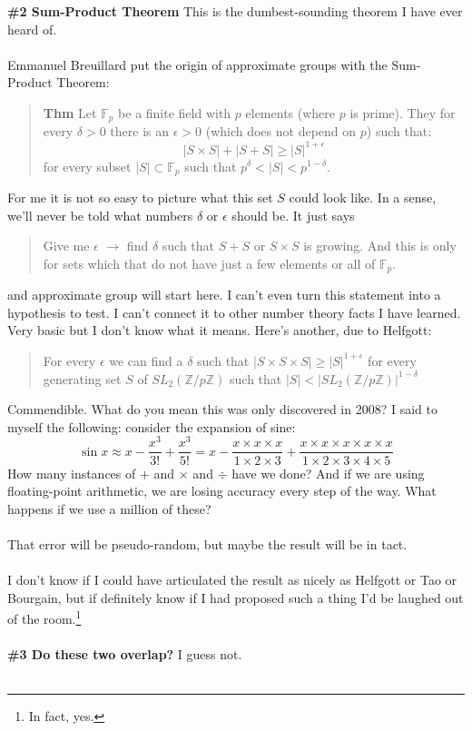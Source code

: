 \documentclass[12pt]{article}
\begin{document}
\textbf{\#2 Sum-Product Theorem}  This is the dumbest-sounding theorem I have ever heard of. \\ \\
Emmanuel Breuillard put the origin of approximate groups with the Sum-Product Theorem:
\begin{quotation}\noindent \textbf{\color{orange!60!red!20!white} Thm } 
{\color{orange!80!black}Let} $\mathbb{F}_p$ {\color{orange!80!black}be a finite field with} $p$ {\color{orange!80!black}elements (where }$p$ {\color{orange!80!black}is prime). They for every} $\delta > 0$ {\color{orange!80!black}there is an} $\epsilon > 0$ {\color{orange!80!black}(which does not depend on} $p${\color{orange!80!black}) such that:}
$$ |S \times S| + |S+S| \geq |S|^{1+\epsilon}  $$
{\color{orange!80!black}for every subset} $|S| \subset \mathbb{F}_p$ {\color{orange!80!black}such that }$p^\delta < |S| < p^{1-\delta}${\color{orange!80!black}.}
\end{quotation}
For me it is not so easy to picture what this set $S$ could look like.  In a sense, we'll never be told what numbers $\delta$ or $\epsilon$ should be.  It just says 
\begin{quotation} \noindent Give me $\epsilon$ $\to$  find $\delta$ such that $S+S$ or $S\times S$ is growing. And this is only for sets which that do not have just a few elements or all of $\mathbb{F}_p$.\end{quotation}
and approximate group will start here.  I can't even turn this statement into a hypothesis to test.  I can't connect it to other number theory facts I have learned.  Very basic but I don't know what it means.  Here's another, due to Helfgott:
\begin{quotation}\noindent 
For every $\epsilon$ we can find a $\delta$ such that $|S \times S \times S| \geq |S|^{1+\epsilon}$ for every generating set $S$ of $SL_2(\mathbb{Z}/p\mathbb{Z})$ such that $|S|< |SL_2(\mathbb{Z}/p\mathbb{Z})|^{1-\delta} $
\end{quotation} Commendible.  What do you mean this was only discovered in 2008?  I said to myself the following:  consider the expansion of sine:
$$ \sin x \approx x - \frac{x^3}{3!} + \frac{x^3}{5!} = 
x - \frac{x \times x \times x}{1 \times  2\times 3 } + \frac{x \times x \times x \times x \times x}{1 \times  2\times 3 \times 4 \times 5}$$
How many instances of $+$ and $\times$ and $\div$ have we done? And if we are using floating-point arithmetic, we are losing accuracy every step of the way.  What happens if we use a million of these?  \\\\
That error will be pseudo-random, but maybe the result will be in tact.  \\\\
I don't know if I could have articulated the result as nicely as Helfgott or Tao or Bourgain, but if definitely know if I had proposed such a thing I'd be laughed out of the room.\footnote{In fact, yes.} \\ \\
\textbf{\#3 Do these two overlap?} I guess not. \\ \\
\end{document}
